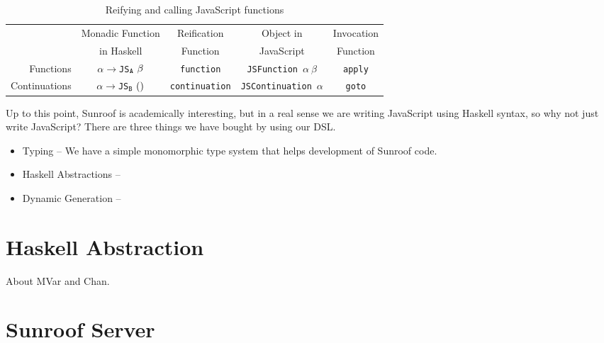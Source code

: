 \documentclass{llncs}
\begin{document}
\begin{table}
\caption{Reifying and calling JavaScript functions}
\begin{center}
\begin{tabular}{r@{\quad}c@{\quad}c@{\quad}c@{\quad}c}
\hline\rule{0pt}{12pt}%

                & Monadic Function      & Reification   & Object in     & Invocation\\
                & in Haskell            & Function      & JavaScript    & Function\\
\hline\rule{0pt}{12pt}%
Functions       & $\alpha\rightarrow${\tt JS}$_{\tt A}~\beta$
                                        & \verb|function|
                                                        & \verb|JSFunction|~$\alpha~\beta$
                                                                        & \verb|apply|\\
Continuations   & $\alpha\rightarrow${\tt JS}$_{\tt B}~()$
                                        & \verb|continuation|
                                                        & \verb|JSContinuation|~$\alpha$
                                                                        & \verb|goto|\\
\hline
\end{tabular}
\end{center}
\end{table} 

Up to this point, Sunroof is academically interesting, but in a real sense
we are writing JavaScript using Haskell syntax, so why not just write
JavaScript? There are three things we have bought by using our DSL.
\begin{itemize}
\item Typing -- We have a simple monomorphic type system that helps development of Sunroof code.
\item Haskell Abstractions --
\item Dynamic Generation -- 
\end{itemize}

\section{Haskell Abstraction}

About MVar and Chan.

\section{Sunroof Server}
\end{document}
